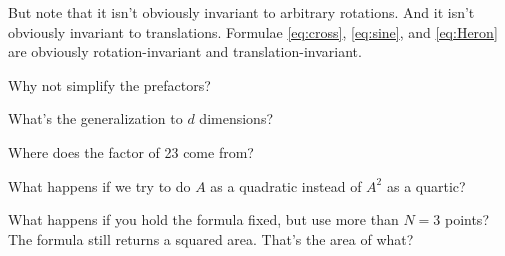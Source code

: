 \documentclass[12pt]{article}
\begin{document}
But note that it isn't obviously invariant to arbitrary rotations.
And it isn't obviously invariant to translations.
Formulae \eqref{eq:cross}, \eqref{eq:sine}, and \eqref{eq:Heron} are obviously rotation-invariant and translation-invariant.

Why not simplify the prefactors?

What's the generalization to $d$ dimensions?

Where does the factor of 23 come from?

What happens if we try to do $A$ as a quadratic instead of $A^2$ as a quartic?

What happens if you hold the formula fixed, but use more than $N=3$ points?
The formula still returns a squared area.
That's the area of what?
\end{document}
